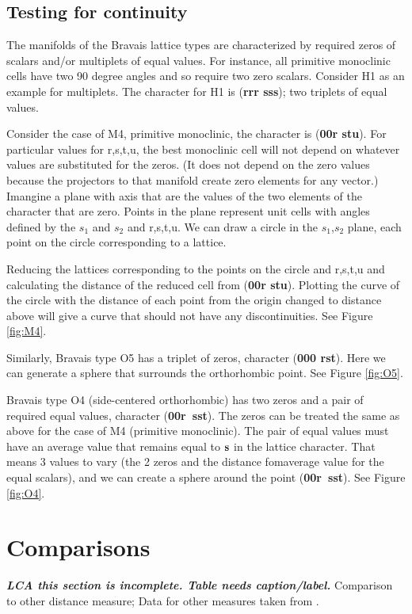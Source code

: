 \documentclass[preprint]{iucr}              %
\newcommand{\scalarsub}[2]{$#1_#2$}
\newcommand{\charseq}[1]{({\bf #1})}
\begin{document}
	\subsection{Testing for continuity}
	
	The manifolds of the Bravais lattice types are characterized by required zeros
	of scalars and/or multiplets of equal values. For instance, all primitive 
	monoclinic cells have two 90 degree angles and so require two zero scalars. Consider H1 as
	an example for multiplets. The character for H1 is \charseq{rrr sss}; two triplets of equal values.
	
	Consider the case of M4, primitive monoclinic, the character is \charseq{00r stu}. 
	For particular values for r,s,t,u, the best monoclinic cell will not
	depend on whatever values are substituted for the zeros. (It does not depend on the zero values because the projectors to that 
	manifold create zero elements for any vector.) Imangine a plane
	with axis that are the values of the two elements of the character that are zero. Points in the plane represent unit 
	cells with angles defined by the \scalarsub{s}{1} and \scalarsub{s}{2} and r,s,t,u. We can draw a circle in the
	\scalarsub{s}{1},\scalarsub{s}{2} plane, each point
	on the circle corresponding to a lattice. 
	
	Reducing the lattices corresponding to the points on the
	circle and r,s,t,u and calculating
	the distance of the reduced cell from \charseq{00r stu}.
	Plotting the curve of the circle with the distance of
	each point from the origin changed to distance above
	 will give a curve that
	should not have any discontinuities. See Figure \ref{fig:M4}. 
	
	Similarly, Bravais type O5 has a triplet of zeros, character \charseq{000 rst}. Here we
	can generate a sphere that surrounds the orthorhombic point. See Figure \ref{fig:O5}.
	
	Bravais type O4 (side-centered orthorhombic) has two zeros and a pair of required equal values, 
character \charseq{00r~sst}. The zeros can be treated the same as above
for the case of M4 (primitive monoclinic). 
	The pair of equal values must 
	have an average value that remains equal to $\bf{s}$ in the lattice character. 
	That means 3 values to vary (the 2 zeros and the distance fomaverage
	value for the equal scalars), and we can create a sphere around 
	the point \charseq{00r~sst}. See Figure \ref{fig:O4}.
	
	
	
	\section{Comparisons}
	\textit{\textbf{LCA this section is incomplete. Table needs caption/label.}}
	Comparison to other distance measure; Data for other measures taken
	from .
	
\end{document}
